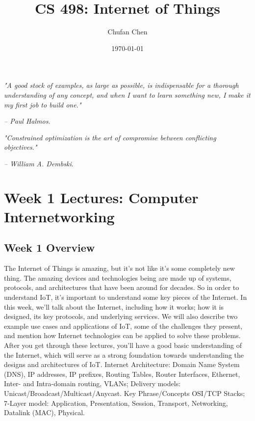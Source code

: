 \documentclass[11 pt]{scrartcl}
\begin{document}
 
\title{\Large CS 498: Internet of Things}
\author{\large Chufan Chen}
\date{\large\today}

\maketitle 

\begin{center}
\begin{displayquote}
    \emph{"A good stock of examples, as large as possible, is indispensable for a thorough understanding of any concept, and when I want to learn something new, I make it my first job to build one."} \\ \begin{flushright} \emph{– Paul Halmos}.  \end{flushright}
\end{displayquote}
\begin{displayquote}
    \emph{"Constrained optimization is the art of compromise between conflicting objectives."} \\ \begin{flushright} \emph{– William A. Dembski}.  \end{flushright}
\end{displayquote}
\end{center}


\tableofcontents 

\newpage

\section{Week 1 Lectures: Computer Internetworking}
\subsection{Week 1 Overview}
The Internet of Things is amazing, but it's not like it's some completely new thing. The amazing devices and technologies being are made up of systems, protocols, and architectures that have been around for decades. So in order to understand IoT, it's important to understand some key pieces of the Internet.\newline
In this week, we'll talk about the Internet, including how it works; how it is designed, its key protocols, and underlying services. We will also describe two example use cases and applications of IoT, some of the challenges they present, and mention how Internet technologies can be applied to solve these problems. After you get through these lectures, you'll have a good basic understanding of the Internet, which will serve as a strong foundation towards understanding the designs and architectures of IoT.
Internet Architecture: Domain Name System (DNS), IP addresses, IP prefixes, Routing Tables, Router Interfaces, Ethernet, Inter- and Intra-domain routing, VLANs; Delivery models: Unicast/Broadcast/Multicast/Anycast.\newline
Key Phrase/Concepts
\itemnum
    \ii OSI/TCP Stacks; 7-Layer model: Application, Presentation, Session, Transport, Networking, Datalink (MAC), Physical.
\end{document}
